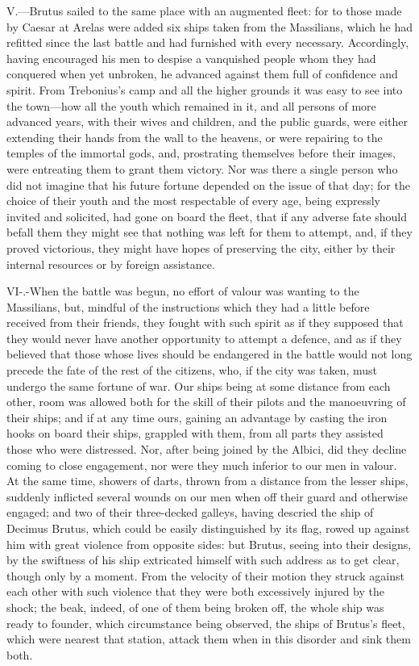V.—Brutus sailed to the same place with an augmented fleet: for to
those made by Caesar at Arelas were added six ships taken from the
Massilians, which he had refitted since the last battle and had
furnished with every necessary. Accordingly, having encouraged his men
to despise a vanquished people whom they had conquered when yet
unbroken, he advanced against them full of confidence and spirit. From
Trebonius's camp and all the higher grounds it was easy to see into the
town—how all the youth which remained in it, and all persons of more
advanced years, with their wives and children, and the public guards,
were either extending their hands from the wall to the heavens, or were
repairing to the temples of the immortal gods, and, prostrating
themselves before their images, were entreating them to grant them
victory. Nor was there a single person who did not imagine that his
future fortune depended on the issue of that day; for the choice of
their youth and the most respectable of every age, being expressly
invited and solicited, had gone on board the fleet, that if any adverse
fate should befall them they might see that nothing was left for them to
attempt, and, if they proved victorious, they might have hopes of
preserving the city, either by their internal resources or by foreign
assistance.

VI-.-When the battle was begun, no effort of valour was wanting to the
Massilians, but, mindful of the instructions which they had a little
before received from their friends, they fought with such spirit as if
they supposed that they would never have another opportunity to attempt
a defence, and as if they believed that those whose lives should be
endangered in the battle would not long precede the fate of the rest of
the citizens, who, if the city was taken, must undergo the same fortune
of war. Our ships being at some distance from each other, room was
allowed both for the skill of their pilots and the manoeuvring of their
ships; and if at any time ours, gaining an advantage by casting the iron
hooks on board their ships, grappled with them, from all parts they
assisted those who were distressed. Nor, after being joined by the
Albici, did they decline coming to close engagement, nor were they much
inferior to our men in valour. At the same time, showers of darts,
thrown from a distance from the lesser ships, suddenly inflicted several
wounds on our men when off their guard and otherwise engaged; and two of
their three-decked galleys, having descried the ship of Decimus Brutus,
which could be easily distinguished by its flag, rowed up against him
with great violence from opposite sides: but Brutus, seeing into their
designs, by the swiftness of his ship extricated himself with such
address as to get clear, though only by a moment. From the velocity of
their motion they struck against each other with such violence that they
were both excessively injured by the shock; the beak, indeed, of one of
them being broken off, the whole ship was ready to founder, which
circumstance being observed, the ships of Brutus's fleet, which were
nearest that station, attack them when in this disorder and sink them
both.

